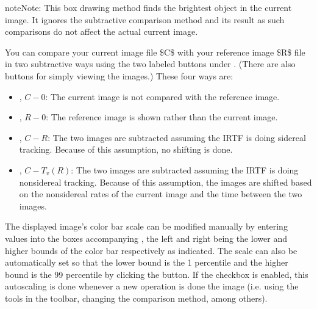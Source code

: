 \documentclass[letterpaper,11pt,english]{sphinxmanual}
\begin{document}
\begin{sphinxadmonition}{note}{Note:}
\sphinxAtStartPar
This box drawing method  finds the brightest object in the current image. It ignores the
subtractive comparison method and its result as such comparisons do not
affect the actual current image.
\end{sphinxadmonition}

\sphinxAtStartPar
You can compare your current image file \$C\$ with your reference image \$R\$ file
in two subtractive ways using the two labeled buttons under
. (There are also buttons for simply viewing the images.)
These four ways are:
\begin{itemize}
\item {} 
\sphinxAtStartPar
{}, \(C-0\): The current image is not compared with the reference image.

\item {} 
\sphinxAtStartPar
{}, \(R-0\): The reference image is shown rather than the current image.

\item {} 
\sphinxAtStartPar
{}, \(C-R\): The two images are subtracted assuming the IRTF is doing sidereal tracking. Because of this assumption, no shifting is done.

\item {} 
\sphinxAtStartPar
{}, \(C-T_v(R)\): The two images are subtracted assuming the IRTF is doing non\sphinxhyphen{}sidereal tracking. Because of this assumption, the images are shifted based on the non\sphinxhyphen{}sidereal rates of the current image and the time between the two images.

\end{itemize}

\sphinxAtStartPar
The displayed image’s color bar scale can be modified manually by entering
values into the boxes accompanying , the left and
right being the lower and higher bounds of the color bar respectively as
indicated. The scale can also be automatically set so that the lower bound is
the 1 percentile and the higher bound is the 99 percentile by clicking the
 button. If the  checkbox is enabled,
this autoscaling is done whenever a new operation is done the image (i.e.
using the tools in the toolbar, changing the comparison method, among others).
\end{document}
